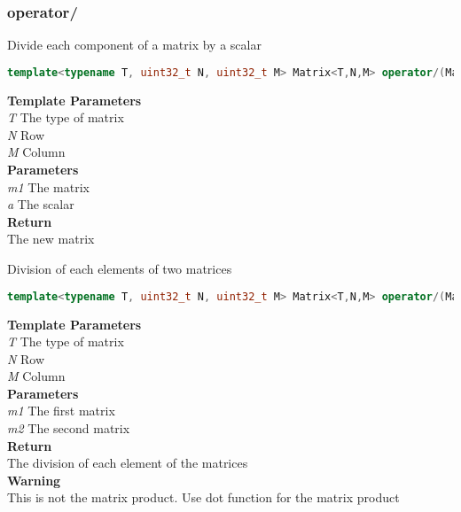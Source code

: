 \subsubsection{operator/}
\begin{mdframed}
Divide each component of a matrix by a scalar
\begin{lstlisting}[language=C++]
template<typename T, uint32_t N, uint32_t M> Matrix<T,N,M> operator/(Matrix<T,N,M> m1, T a) 
\end{lstlisting}
\textbf{Template Parameters} \\ 
\textit{T} The type of matrix \\ 
\textit{N} Row \\ 
\textit{M} Column \\ 
\textbf{Parameters} \\ 
\textit{m1} The matrix \\ 
\textit{a} The scalar \\ 
\textbf{Return} \\ 
The new matrix\\ 
\end{mdframed}

\begin{mdframed}
Division of each elements of two matrices
\begin{lstlisting}[language=C++]
template<typename T, uint32_t N, uint32_t M> Matrix<T,N,M> operator/(Matrix<T,N,M> m1, const Matrix<T,N,M>& m2) 
\end{lstlisting}
\textbf{Template Parameters} \\ 
\textit{T} The type of matrix \\ 
\textit{N} Row \\ 
\textit{M} Column \\ 
\textbf{Parameters} \\ 
\textit{m1} The first matrix \\ 
\textit{m2} The second matrix \\ 
\textbf{Return} \\ 
The division of each element of the matrices\\ 
\textbf{Warning} \\ 
This is not the matrix product. Use dot function for the matrix product\\ 
\end{mdframed}

